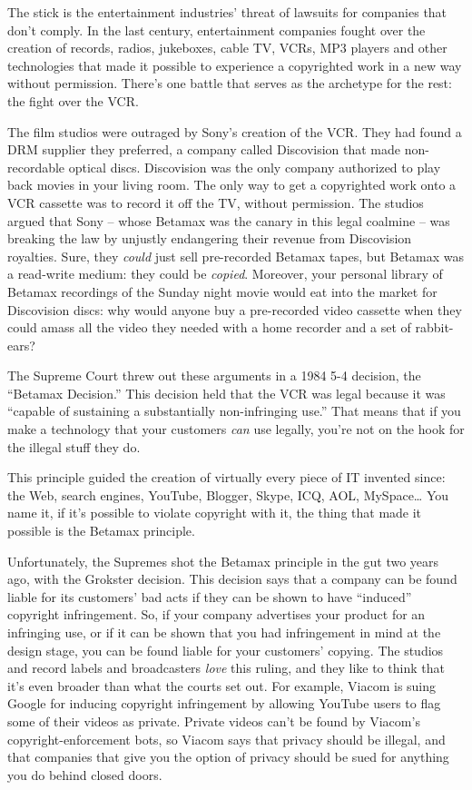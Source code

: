 The stick is the entertainment industries' threat of lawsuits for
companies that don't comply. In the last century, entertainment
companies fought over the creation of records, radios, jukeboxes,
cable TV, VCRs, MP3 players and other technologies that made it
possible to experience a copyrighted work in a new way without
permission. There's one battle that serves as the archetype for the
rest: the fight over the VCR.

The film studios were outraged by Sony's creation of the VCR. They
had found a DRM supplier they preferred, a company called
Discovision that made non-recordable optical discs. Discovision was
the only company authorized to play back movies in your living
room. The only way to get a copyrighted work onto a VCR cassette
was to record it off the TV, without permission. The studios argued
that Sony -- whose Betamax was the canary in this legal coalmine --
was breaking the law by unjustly endangering their revenue from
Discovision royalties. Sure, they \emph{could} just sell
pre-recorded Betamax tapes, but Betamax was a read-write medium:
they could be \emph{copied}. Moreover, your personal library of
Betamax recordings of the Sunday night movie would eat into the
market for Discovision discs: why would anyone buy a pre-recorded
video cassette when they could amass all the video they needed with
a home recorder and a set of rabbit-ears?

The Supreme Court threw out these arguments in a 1984 5-4 decision,
the ``Betamax Decision.'' This decision held that the VCR was legal
because it was ``capable of sustaining a substantially
non-infringing use.'' That means that if you make a technology that
your customers \emph{can} use legally, you're not on the hook for
the illegal stuff they do.

This principle guided the creation of virtually every piece of IT
invented since: the Web, search engines, YouTube, Blogger, Skype,
ICQ, AOL, MySpace\ldots{} You name it, if it's possible to violate
copyright with it, the thing that made it possible is the Betamax
principle.

Unfortunately, the Supremes shot the Betamax principle in the gut
two years ago, with the Grokster decision. This decision says that
a company can be found liable for its customers' bad acts if they
can be shown to have ``induced'' copyright infringement. So, if your
company advertises your product for an infringing use, or if it can
be shown that you had infringement in mind at the design stage, you
can be found liable for your customers' copying. The studios and
record labels and broadcasters \emph{love} this ruling, and they
like to think that it's even broader than what the courts set out.
For example, Viacom is suing Google for inducing copyright
infringement by allowing YouTube users to flag some of their videos
as private. Private videos can't be found by Viacom's
copyright-enforcement bots, so Viacom says that privacy should be
illegal, and that companies that give you the option of privacy
should be sued for anything you do behind closed doors.

